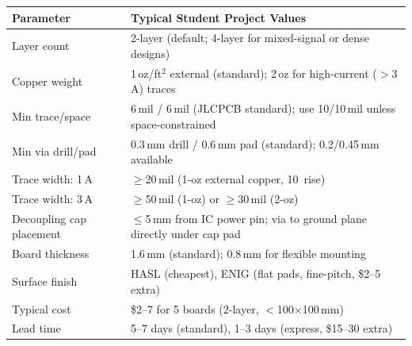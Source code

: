 \begin{quickrefbox}
\begin{table}[H]\centering\small
\begin{tabularx}{\textwidth}{l X}
\toprule
\textbf{Parameter} & \textbf{Typical Student Project Values} \\
\midrule
Layer count & 2-layer (default; 4-layer for mixed-signal or dense designs) \\
Copper weight & 1\,oz/ft$^2$ external (standard); 2\,oz for high-current ($>$3\,A) traces \\
Min trace/space & 6\,mil / 6\,mil (JLCPCB standard); use 10/10\,mil unless space-constrained \\
Min via drill/pad & 0.3\,mm drill / 0.6\,mm pad (standard); 0.2/0.45\,mm available \\
Trace width: 1\,A & $\geq$20\,mil (1-oz external copper, 10\,\degC{} rise) \\
Trace width: 3\,A & $\geq$50\,mil (1-oz) or $\geq$30\,mil (2-oz) \\
Decoupling cap placement & $\leq$5\,mm from IC power pin; via to ground plane directly under cap pad \\
Board thickness & 1.6\,mm (standard); 0.8\,mm for flexible mounting \\
Surface finish & HASL (cheapest), ENIG (flat pads, fine-pitch, \$2--5 extra) \\
Typical cost & \$2--7 for 5 boards (2-layer, $<$100$\times$100\,mm) \\
Lead time & 5--7 days (standard), 1--3 days (express, \$15--30 extra) \\
\bottomrule
\end{tabularx}
\end{table}
\end{quickrefbox}

